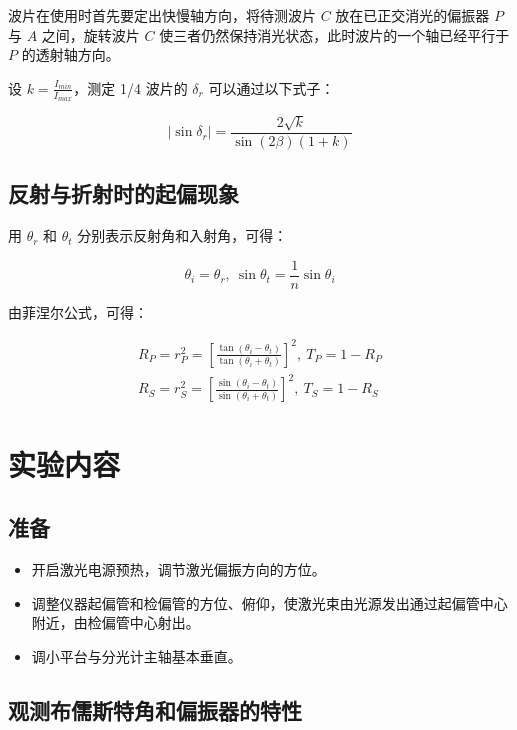 \documentclass[a4paper]{article}
\begin{document}
\par 波片在使用时首先要定出快慢轴方向，将待测波片 $C$ 放在已正交消光的偏振器 $P$ 与 $A$ 之间，旋转波片 $C$ 使三者仍然保持消光状态，此时波片的一个轴已经平行于 $P$ 的透射轴方向。

\par 设 $k=\frac{I_{min}}{I_{max}}$，测定 1/4 波片的 $\delta_r$ 可以通过以下式子：

\[
    |\sin\delta_r|=\frac{2\sqrt{k}}{\sin(2\beta)(1+k)}
\]

\subsection{反射与折射时的起偏现象}

\par 用 $\theta_r$ 和 $\theta_t$ 分别表示反射角和入射角，可得：

\[
    \theta_i=\theta_r,\ \sin\theta_t=\frac{1}{n}\sin\theta_i
\]

\par 由菲涅尔公式，可得：

\[
\begin{array}{l}
    R_P=r_P^2=[\frac{\tan(\theta_i-\theta_t)}{\tan(\theta_i+\theta_t)}]^2,\ T_P=1-R_P\\
    R_S=r_S^2=[\frac{\sin(\theta_i-\theta_t)}{\sin(\theta_i+\theta_t)}]^2,\ T_S=1-R_S
\end{array}
\]

\section{实验内容}

\subsection{准备}

\begin{itemize}
    \item 开启激光电源预热，调节激光偏振方向的方位。
    \item 调整仪器起偏管和检偏管的方位、俯仰，使激光束由光源发出通过起偏管中心附近，由检偏管中心射出。
    \item 调小平台与分光计主轴基本垂直。
\end{itemize}

\subsection{观测布儒斯特角和偏振器的特性}
\end{document}
